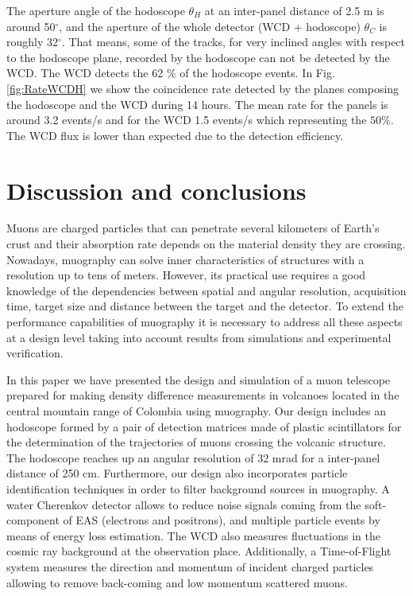 \documentclass[letterpaper,11pt]{article}
\begin{document}
The aperture angle of the hodoscope $\theta_H$ at an inter-panel distance of 2.5 m is around 50$^{\circ}$, and the aperture of the whole detector (WCD + hodoscope) $\theta_C$ is roughly 32$^{\circ}$. That means, some of the tracks, for very inclined angles with respect to the hodoscope plane, recorded by the hodoscope can not be detected by the WCD. The WCD detects the 62 $\%$ of the hodoscope events. In Fig. \ref{fig:RateWCDH} we show the coincidence rate detected by the planes composing the hodoscope and the WCD during 14 hours. The mean rate for the panels is around 3.2 events/s and for the WCD 1.5 events/s which representing the $50\%$. The WCD flux is lower than expected due to the detection efficiency.


\section{Discussion and conclusions}
\label{conclusions}

Muons are charged particles that can penetrate several kilometers of Earth's crust and their absorption rate depends on the material density they are crossing. Nowadays, muography can solve inner characteristics of structures with a resolution up to tens of meters. However, its practical use requires a good knowledge of the dependencies between spatial and angular resolution, acquisition time, target size and distance between the target and the detector. To extend the performance capabilities of muography it is necessary to address all these aspects at a design level taking into account results from simulations and experimental verification.

In this paper we have presented the design and simulation of a muon telescope prepared for making density difference measurements in volcanoes located in the central mountain range of Colombia using muography. Our design includes an hodoscope formed by a pair of detection matrices made of plastic scintillators for the determination of the trajectories of muons crossing the volcanic structure. The hodoscope reaches up an angular resolution of 32 mrad for a inter-panel distance of 250 cm. Furthermore, our design also incorporates particle identification techniques in order to filter background sources in muography. A water Cherenkov detector allows to reduce noise signals coming from the soft-component of EAS (electrons and positrons), and multiple particle events by means of energy loss estimation. The WCD also measures fluctuations in the cosmic ray background at the observation place. Additionally, a Time-of-Flight system measures the direction and momentum of incident charged particles allowing to remove back-coming and low momentum scattered muons.
\end{document}
